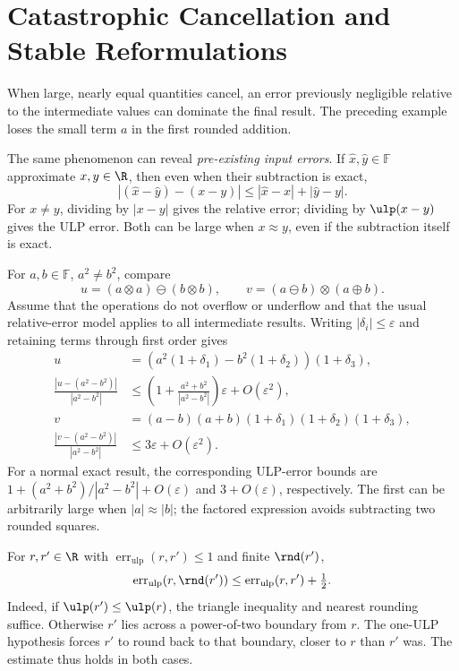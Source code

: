 \section{Catastrophic Cancellation and Stable Reformulations}

\begin{remark}
When large, nearly equal quantities cancel, an error previously
negligible relative to the intermediate values can dominate the
final result. The preceding example loses the small term $a$ in
the first rounded addition.

The same phenomenon can reveal \emph{pre-existing input errors}.
If $\widehat{x},\widehat{y}\in\mathbb F$ approximate $x,y\in\R$,
then even when their subtraction is exact,
\[
 |(\widehat{x}-\widehat{y})-(x-y)|
 \le |\widehat{x}-x|+|\widehat{y}-y|.
\]
For $x\ne y$, dividing by $|x-y|$ gives the relative error;
dividing by $\ulp(x-y)$ gives the ULP error. Both can be large
when $x\approx y$, even if the subtraction itself is exact.
\end{remark}


\begin{example}
For $a, b\in\mathbb F$, $a^2\ne b^2$, compare
\[
 u=(a\otimes a)\ominus(b\otimes b), \qquad
 v=(a\ominus b)\otimes(a\oplus b).
\]
Assume that the operations do not overflow or underflow and that the
usual relative-error model applies to all intermediate results.
Writing $|\delta_i|\le\varepsilon$ and retaining terms through first
order gives
\[
\begin{aligned}
 u&=(a^2(1+\delta_1)-b^2(1+\delta_2))(1+\delta_3), \\
 \frac{|u-(a^2-b^2)|}{|a^2-b^2|}
 &\le\left(1+\frac{a^2+b^2}{|a^2-b^2|}\right)\varepsilon
   +O(\varepsilon^2), \\
 v&=(a-b)(a+b)(1+\delta_1)(1+\delta_2)(1+\delta_3), \\
 \frac{|v-(a^2-b^2)|}{|a^2-b^2|}
 &\le3\varepsilon+O(\varepsilon^2).
\end{aligned}
\]
For a normal exact result, the corresponding ULP-error bounds are
$1+(a^2+b^2)/|a^2-b^2|+O(\varepsilon)$ and $3+O(\varepsilon)$,
respectively. The first can be arbitrarily large when $|a|\approx|b|$;
the factored expression avoids subtracting two rounded squares.
\end{example}

\begin{remark}
For $r, r'\in\R$ with
$\operatorname{err}_{\mathrm{ulp}}(r, r')\le1$ and finite $\rnd(r')$,
\[
 \operatorname{err}_{\mathrm{ulp}}(r, \rnd(r'))
 \le\operatorname{err}_{\mathrm{ulp}}(r, r')+\tfrac12.
\]
Indeed, if $\ulp(r')\le\ulp(r)$, the triangle inequality and nearest
rounding suffice. Otherwise $r'$ lies across a power-of-two boundary
from $r$. The one-ULP hypothesis forces $r'$ to round back to that
boundary, closer to $r$ than $r'$ was. The estimate thus holds in both
cases.
\end{remark}

